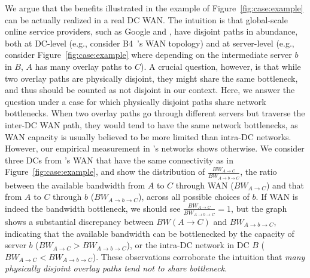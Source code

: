 We argue that the benefits illustrated in the example of
Figure~\ref{fig:case:example} can be actually realized in a
real DC WAN. The intuition is that
global-scale online service providers,
such as Google and \company, have disjoint paths in abundance,
both at DC-level (e.g., consider B4~\cite{b4}'s WAN topology)
and at server-level (e.g., consider Figure~\ref{fig:case:example}
where depending on the intermediate server $b$ in $B$,
$A$ has many overlay paths to $C$).
A crucial question, however, is that while two overlay paths are
physically disjoint, they might share the same bottleneck, and
thus should be counted as not disjoint in our context.
Here, we answer the question under a case for which physically
disjoint paths share network bottlenecks.
When two overlay paths go through different servers but traverse
the inter-DC WAN path, they would tend to have the same network
bottlenecks, as WAN capacity is usually believed to be more
limited than intra-DC networks.
However, our empirical measurement in \company's networks shows
otherwise.
We consider three DCs from \company's WAN that have the same
connectivity as in Figure~\ref{fig:case:example},
and show the distribution of
$\frac{BW_{A\rightarrow C}}{BW_{A\rightarrow b\rightarrow C}}$,
the ratio between the available bandwidth
from $A$ to $C$ through WAN ($BW_{A\rightarrow C}$) and
that from $A$ to $C$ through $b$
($BW_{A\rightarrow b\rightarrow C}$),
across all possible choices of $b$.
If WAN is indeed the bandwidth bottleneck, we should see
$\frac{BW_{A\rightarrow C}}{BW_{A\rightarrow b\rightarrow C}}=1$,
but the graph shows a substantial discrepancy between
$BW(A\rightarrow C)$ and $BW_{A\rightarrow b\rightarrow C}$,
indicating that the available bandwidth can be bottlenecked by
the capacity of server $b$
($BW_{A\rightarrow C}>BW_{A\rightarrow b\rightarrow C}$),
or the intra-DC network in DC $B$
($BW_{A\rightarrow C}<BW_{A\rightarrow b\rightarrow C}$).
These observations corroborate the intuition that
{\em many physically
disjoint overlay paths tend not to share bottleneck}.



